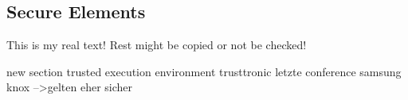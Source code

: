 \subsection{Secure Elements}\label{subsection:external-secure}
This is my real text! Rest might be copied or not be checked!



new section trusted execution environment
trusttronic letzte conference
samsung knox
-->gelten eher sicher
